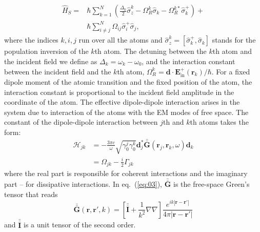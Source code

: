 \documentclass[aps,prl,twocolumn,superscriptaddress,showpacs,amsmath,amssymb]{revtex4-2}
\begin{document}
\begin{align} \label{eq:02}
    \hat{H}_S =& \hbar \sum_{k=1}^N \left( \frac{\Delta_k}{2} \hat{\sigma}_z^k - \Omega_R^k \hat{\sigma}_k - \Omega_R^{k*} \hat{\sigma}_k^+ \right) + \nonumber \\
               & \hbar \sum_{i \neq j}^N \Omega_{ij} \hat{\sigma}_i^+ \hat{\sigma}_j,
\end{align}
where the indices $k,i,j$ run over all the atoms and $\hat{\sigma}_z^k = \left[ \hat{\sigma}_k^+, \hat{\sigma}_k \right]$ stands for the population inversion of the $k$th atom. 
The detuning between the $k$th atom and the incident field we define as $\Delta_k = \omega_k - \omega_0$, and the interaction constant between the incident field and the $k$th atom, $\Omega_R^k = \mathbf{d} \cdot \mathbf{E}_\mathrm{in}^+ (\mathbf{r}_k) / \hbar$. 
For a fixed dipole moment of the atomic transition and the fixed position of the atom, the interaction constant is proportional to the incident field amplitude in the coordinate of the atom. 
The effective dipole-dipole interaction arises in the system due to interaction of the atoms with the EM modes of free space. 
The constant of the dipole-dipole interaction between $j$th and $k$th atoms takes the form:
\begin{align} \label{eq:03}
    \mathcal{H}_{jk} &= - \frac{3 \pi c}{\omega} \sqrt{\gamma_0^j \gamma_0^k} \mathbf{d}_j^* \bar{\bar{\mathbf{G}}}(\mathbf{r}_j, \mathbf{r}_k, \omega) \mathbf{d}_k  \\
                     & = \Omega_{jk} - \frac{i}{2} \Gamma_{jk} \nonumber
\end{align}
where the real part is responsible for coherent interactions and the imaginary part -- for dissipative interactions.
In eq.~(\ref{eq:03}), $\bar{\bar{\mathbf{G}}}$ is the free-space Green's tensor that reads
\begin{equation}
    \bar{\bar{\mathbf{G}}}(\mathbf{r}, \mathbf{r}', k) = \left[ \bar{\bar{\mathbf{I}}} + \frac{1}{k^2} \nabla \nabla \right] \frac{e^{i k |\mathbf{r} - \mathbf{r}'|}}{4 \pi |\mathbf{r} - \mathbf{r}'|}
    \label{eq:04}
\end{equation}
and $\bar{\bar{\mathbf{I}}}$ is a unit tensor of the second order.
\end{document}
